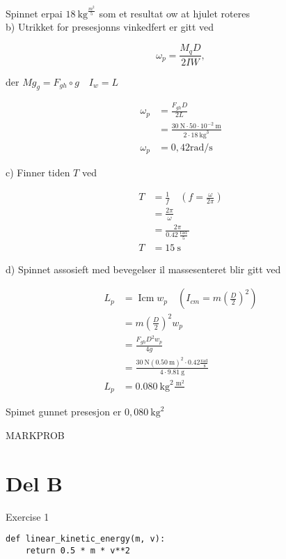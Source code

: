 \documentclass[10pt]{article}
\begin{document}
Spinnet erpai $18 \mathrm{~kg}^{\frac{m^{2}}{5}}$ som et resultat ow at hjulet roteres\\
b) Utrikket for presesjonns vinkedfert er gitt ved

$$
\omega_{p}=\frac{M_{q} D}{2 I W},
$$

der $M g_{g}=F_{g h} \circ g \quad I_{w}=L$

$$
\begin{aligned}
\omega_{p} & =\frac{F_{g h} D}{2 L} \\
& =\frac{30 \mathrm{~N} \cdot 50 \cdot 10^{-2} \mathrm{~m}}{2 \cdot 18 \mathrm{~kg}^{3}} \\
\omega_{p} & =0,42 \mathrm{rad} / \mathrm{s}
\end{aligned}
$$

c) Finner tiden $T$ ved

$$
\begin{aligned}
T & =\frac{1}{f} \quad\left(f=\frac{\omega}{2 \pi}\right) \\
& =\frac{2 \pi}{\omega} \\
& =\frac{2 \pi}{0.42 \frac{\operatorname{rad}}{5}} \\
T & =15 \mathrm{~s}
\end{aligned}
$$

d) Spinnet assosieft med bevegelser il massesenteret blir gitt ved

$$
\begin{aligned}
L_{p} & =\operatorname{Icm} w_{p} \quad\left(I_{c m}=m\left(\frac{D}{2}\right)^{2}\right) \\
& =m\left(\frac{D}{2}\right)^{2} w_{p} \\
& =\frac{F_{g h} D^{2} w_{p}}{4 g} \\
& =\frac{30 \mathrm{~N}(0.50 \mathrm{~m})^{2} \cdot 0.42 \frac{\mathrm{rad}}{\mathrm{~s}}}{4 \cdot 9.81 \mathrm{~g}} \\
L_{p} & =0.080 \mathrm{~kg}^{2} \frac{\mathrm{~m}^{2}}{}
\end{aligned}
$$

Spimet gunnet presesjon er $0,080 \mathrm{~kg}^{2}$

MARKPROB

\section*{Del B}
Exercise 1

\begin{verbatim}
def linear_kinetic_energy(m, v):
    return 0.5 * m * v**2
\end{verbatim}
\end{document}
